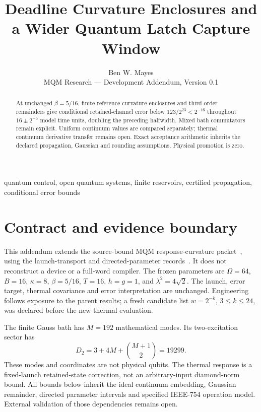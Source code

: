 \documentclass[a4paper,journal]{IEEEtran}
\title{Deadline Curvature Enclosures and a Wider Quantum Latch Capture Window}
\author{Ben W. Mayes\\MQM Research --- Development Addendum, Version 0.1}
\begin{document}
\maketitle
\begin{abstract}
At unchanged $\beta=5/16$, finite-reference curvature enclosures and third-order remainders give conditional retained-channel error below $123/2^{23}<2^{-16}$ throughout $16\pm2^{-5}$ model time units, doubling the preceding halfwidth. Mixed bath commutators remain explicit. Uniform continuum values are compared separately; thermal continuum derivative transfer remains open. Exact acceptance arithmetic inherits the declared propagation, Gaussian and rounding assumptions. Physical promotion is zero.
\end{abstract}
\begin{IEEEkeywords}quantum control, open quantum systems, finite reservoirs, certified propagation, conditional error bounds\end{IEEEkeywords}
\section{Contract and evidence boundary}
This addendum extends the source-bound MQM response-curvature packet~\cite{parent}, using the launch-transport and directed-parameter records~\cite{launch,jet}. It does not reconstruct a device or a full-word compiler. The frozen parameters are $\Omega=64$, $B=16$, $\kappa=8$, $\beta=5/16$, $T=16$, $h=g=1$, and $\lambda^2=4\sqrt2$. The launch, error target, thermal covariance and error interpretation are unchanged. Engineering follows exposure to the parent results; a fresh candidate list $w=2^{-k}$, $3\le k\le24$, was declared before the new thermal evaluation.

The finite Gauss bath has $M=192$ mathematical modes. Its two-excitation sector has
\begin{equation}D_2=3+4M+\binom{M+1}{2}=19299.\end{equation}
These modes and coordinates are not physical qubits. The thermal response is a fixed-launch retained-state correction, not an arbitrary-input diamond-norm bound. All bounds below inherit the ideal continuum embedding, Gaussian remainder, directed parameter intervals and specified IEEE-754 operation model. External validation of those dependencies remains open.
\end{document}
